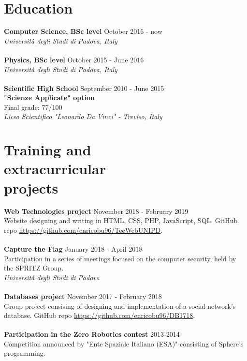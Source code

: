 \documentclass[margin, 10pt]{res}
\begin{document}
\begin{resume}
\section{Education}
\textbf{Computer Science, BSc level} \hfill October 2016 - now \\
\textit{Università degli Studi di Padova, Italy} \\ \\
\textbf{Physics, BSc level} \hfill October 2015 - June 2016 \\
\textit{Università degli Studi di Padova, Italy} \\ \\
\textbf{Scientific High School} \hfill September 2010 - June 2015 \\
\textbf{"Scienze Applicate" option} \\
Final grade: 77/100 \\
\textit{Liceo Scientifico "Leonardo Da Vinci" - Treviso, Italy} 


\section{Training and\\ extracurricular \\ projects}
\textbf{Web Technologies project} \hfill November 2018 - February 2019 \\
Website designing and writing in HTML, CSS, PHP, JavaScript, SQL. GitHub repo \href{here}{https://github.com/enricobu96/TecWebUNIPD}.\\ \\
\textbf{Capture the Flag} \hfill January 2018 - April 2018 \\
Participation in a series of meetings focused on the computer security, held by the SPRITZ Group. \\
\textit{Università degli Studi di Padova} \\ \\
\textbf{Databases project} \hfill November 2017 - February 2018 \\
Group project consising of designing and implementation of a social network's database. GitHub repo \href{here}{https://github.com/enricobu96/DB1718}. \\ \\
\textbf{Participation in the Zero Robotics contest} \hfill 2013-2014 \\
Competition announced by "Ente Spaziale Italiano (ESA)" consisting of Sphere's programming.


\end{resume}
\end{document}
